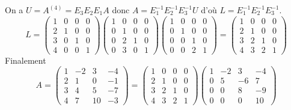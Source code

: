 \documentclass[a4paper]{article}
\begin{document}
\begin{enumerate}
\begin{itemize}
\end{itemize}
On a $U=A^{(4)}=E_3 E_2 E_1 A$ donc $A=E_1^{-1}E_2^{-1}E_3^{-1}U$ d'où $L=E_1^{-1}E_2^{-1}E_3^{-1}$.
\[L=\left(\begin{array}{cccc}
1&0&0&0\\
2&1&0&0\\
3&0&1&0\\
4&0&0&1
\end{array}\right)\left(\begin{array}{cccc}
1&0&0&0\\
0&1&0&0\\
0&2&1&0\\
0&3&0&1
\end{array}\right)\left(\begin{array}{cccc}
1&0&0&0\\
0&1&0&0\\
0&0&1&0\\
0&0&2&1
\end{array}\right)=\left(\begin{array}{cccc}
1&0&0&0\\
2&1&0&0\\
3&2&1&0\\
4&3&2&1
\end{array}\right)
\]
Finalement
\[A=\left(\begin{array}{cccc}
1&-2&3&-4\\
2&1&0&-1\\
3&4&5&-7\\
4&7&10&-3
\end{array}\right)=\left(\begin{array}{cccc}
1&0&0&0\\
2&1&0&0\\
3&2&1&0\\
4&3&2&1
\end{array}\right) \left(\begin{array}{cccc}
1&-2&3&-4\\
0&5&-6&7\\
0&0&8&-9\\
0&0&0&10
\end{array}\right)
\]
%

\end{enumerate}
\end{document}
